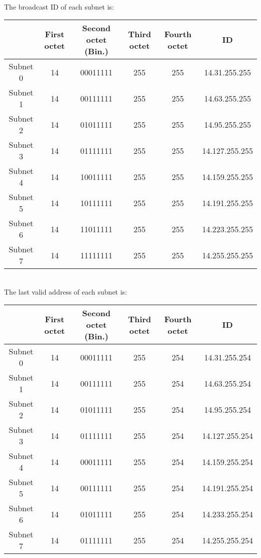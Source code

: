 \documentclass{article}
\begin{document}
~\\ The broadcast ID of each subnet is:
\begin{table}[h!]
\centering
\begin{tabular}{|c|c|c|c|c|c|}
\hline
& First octet & Second octet (Bin.) & Third octet & Fourth octet & ID \\ \hline
Subnet 0 & 14 & 00011111 & 255 & 255 & 14.31.255.255 \\
Subnet 1 & 14 & 00111111 & 255 & 255 & 14.63.255.255 \\
Subnet 2 & 14 & 01011111 & 255 & 255 & 14.95.255.255 \\
Subnet 3 & 14 & 01111111 & 255 & 255 & 14.127.255.255\\
Subnet 4 & 14 & 10011111 & 255 & 255 & 14.159.255.255\\
Subnet 5 & 14 & 10111111 & 255 & 255 & 14.191.255.255 \\
Subnet 6 & 14 & 11011111 & 255 & 255 & 14.223.255.255\\
Subnet 7 & 14 & 11111111 & 255 & 255 & 14.255.255.255 \\ \hline
\end{tabular}
\end{table}

~\\ The last valid address of each subnet is:
\begin{table}[h!]
\centering
\begin{tabular}{|c|c|c|c|c|c|}
\hline
& First octet & Second octet (Bin.) & Third octet & Fourth octet & ID \\ \hline
Subnet 0 & 14 & 00011111 & 255 & 254 & 14.31.255.254 \\
Subnet 1 & 14 & 00111111 & 255 & 254 & 14.63.255.254 \\
Subnet 2 & 14 & 01011111 & 255 & 254 & 14.95.255.254 \\
Subnet 3 & 14 & 01111111 & 255 & 254 & 14.127.255.254\\
Subnet 4 & 14 & 00011111 & 255 & 254 & 14.159.255.254 \\
Subnet 5 & 14 & 00111111 & 255 & 254 & 14.191.255.254 \\
Subnet 6 & 14 & 01011111 & 255 & 254 & 14.233.255.254 \\
Subnet 7 & 14 & 01111111 & 255 & 254 & 14.255.255.254\\ \hline


\end{tabular}
\end{table}
\newpage
\end{document}
